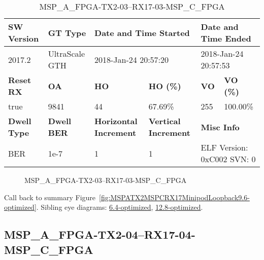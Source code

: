 \begin{table}[h]
\centering
\caption{MSP\_A\_FPGA-TX2-03--RX17-03-MSP\_C\_FPGA}
\label{tab:MSPAFPGATX203RX1703MSPCFPGA9.6-optimized}
\begin{tabular}{@{}|l|l|l|l|l|l|@{}}
\toprule
\textbf{SW Version}                & \textbf{GT Type}   & \multicolumn{2}{l|}{\textbf{Date and Time Started}}            & \multicolumn{2}{l|}{\textbf{Date and Time Ended}}        \\ \midrule
2017.2                       & UltraScale GTH          & \multicolumn{2}{l|}{2018-Jan-24 20:57:20}                   & \multicolumn{2}{l|}{2018-Jan-24 20:57:53}               \\ \midrule
\textbf{Reset RX}                  & \textbf{OA} & \textbf{HO}   & \textbf{HO (\%)} & \textbf{VO} & \textbf{VO (\%)} \\ \midrule
true & 9841        & 44          & 67.69\%        & 255        & 100.00\%       \\ \midrule
\textbf{Dwell Type}                & \textbf{Dwell BER} & \textbf{Horizontal Increment} & \textbf{Vertical Increment}    & \multicolumn{2}{l|}{\textbf{Misc Info}}                  \\ \midrule
BER                            & 1e-7        & 1        & 1           & \multicolumn{2}{l|}{ELF Version: 0xC002 SVN: 0}                         \\ \bottomrule
\end{tabular}
\end{table}

\begin{figure}[h]
\caption{MSP\_A\_FPGA-TX2-03--RX17-03-MSP\_C\_FPGA} \label{fig:MSPAFPGATX203RX1703MSPCFPGA9.6-optimized}
\end{figure}

Call back to summary Figure~\ref{fig:MSPATX2MSPCRX17MinipodLoopback9.6-optimized}.
Sibling eye diagrams: \hyperref[sec:MSPAFPGATX203RX1703MSPCFPGA6.4-optimized]{6.4-optimized}, \hyperref[sec:MSPAFPGATX203RX1703MSPCFPGA12.8-optimized]{12.8-optimized}.

\clearpage
\newpage


\subsection{MSP\_A\_FPGA-TX2-04--RX17-04-MSP\_C\_FPGA}\label{sec:MSPAFPGATX204RX1704MSPCFPGA9.6-optimized}

